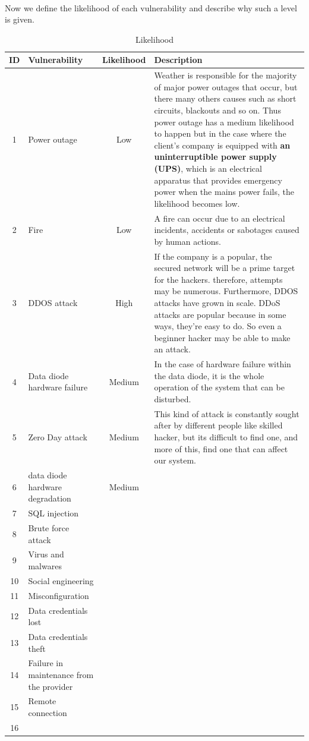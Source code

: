 \documentclass[a4paper,10pt]{article}
\begin{document}
\paragraph{} Now we define the likelihood of each vulnerability and describe why such a level is given.

\begin{table}[!h]
	\centering
	\begin{tabular}{|c|p{}|c|p{10cm}|}
		\hline
		\textbf{ID}& \textbf{Vulnerability} & \textbf{Likelihood} & \textbf{Description}                 \\
		\hline
		1 & Power outage & Low & Weather is responsible for the majority of major power outages that occur, but there many others causes such as short circuits, blackouts and so on. Thus power outage has a medium likelihood to happen but in the case where the client's company is equipped with \textbf{an uninterruptible power supply (UPS)}, which is an electrical apparatus that provides emergency power when the mains power fails, the likelihood becomes low.    \\
		\hline
		2 & Fire & Low  &  A fire can occur due to an electrical incidents, accidents or sabotages caused by human actions.\\
		\hline
		3 & DDOS attack & High & If the company is a popular, the secured network will be a prime target for the hackers. therefore, attempts may be numerous. Furthermore, DDOS attacks have grown in scale. DDoS attacks are popular because in some ways, they're easy to do. So even a beginner hacker may be able to make an attack.\\
		\hline
		4 & Data diode hardware failure  & Medium & In the case of hardware failure within the data diode, it is the whole operation of the system that can be disturbed.\\
		\hline
		5 & Zero Day attack & Medium & This kind of attack is constantly sought after by different people like skilled hacker, but its difficult to find one, and more of this, find one that can affect our system. \\
		\hline
		6 & data diode hardware degradation & Medium & \\
		\hline
		7 &  SQL injection &  &   \\
		\hline
		8 & Brute force attack &  & \\
		\hline
		9 & Virus and malwares &  & \\
		\hline
		10 & Social engineering  &  & \\
		\hline
		11 & Misconfiguration &  & \\
		\hline
		12 & Data credentials lost &  & \\
		\hline
		13 &  Data credentials theft&  & \\
		\hline
		14 & Failure in maintenance from the provider &  & \\
		\hline
		15 & Remote connection &  & \\
		\hline
		16 &  &  & \\
		\hline
	\end{tabular}
	\caption{Likelihood}
\end{table}
\end{document}
